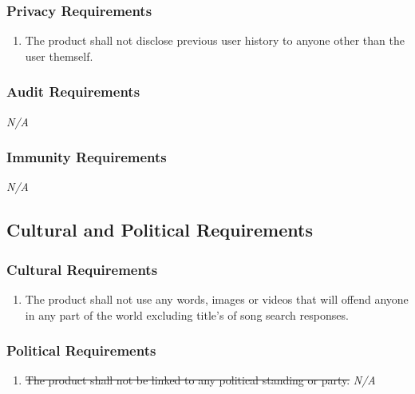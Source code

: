 \documentclass[]{article}
\newcounter{saveenum}
\newcommand{\pauseEnum}{\setcounter{saveenum}{\value{enumi}}}
\newcommand{\resumeEnum}{\setcounter{enumi}{\value{saveenum}}}
\newcommand{\NA}{\indent\indent\emph{N/A}}
\begin{document}
\subsubsection{Privacy Requirements}
\label{ssub:privacy_requirements}
\begin{enumerate}[{SR}1. ]
	\resumeEnum
	\item The product shall not disclose previous user history to anyone other than the user themself.
	\pauseEnum
\end{enumerate}

\subsubsection{Audit Requirements}
\label{ssub:audit_requirements}
	\NA

\subsubsection{Immunity Requirements}
\label{ssub:immunity_requirements}
	\NA


\subsection{Cultural and Political Requirements}
\label{sub:cultural_and_political_requirements}

\subsubsection{Cultural Requirements}
\label{ssub:cultural_requirements}
\begin{enumerate}[{CP}1. ]
	\item The product shall not use any words, images or videos that will offend anyone in any part of the world excluding title's of song search responses.
	\pauseEnum
\end{enumerate}

\subsubsection{Political Requirements}
\label{ssub:political_requirements}
\begin{enumerate}[{CP}1. ]
	\resumeEnum
	\item \sout{The product shall not be linked to any political standing or party.} \NA
	\pauseEnum
\end{enumerate}
\end{document}
